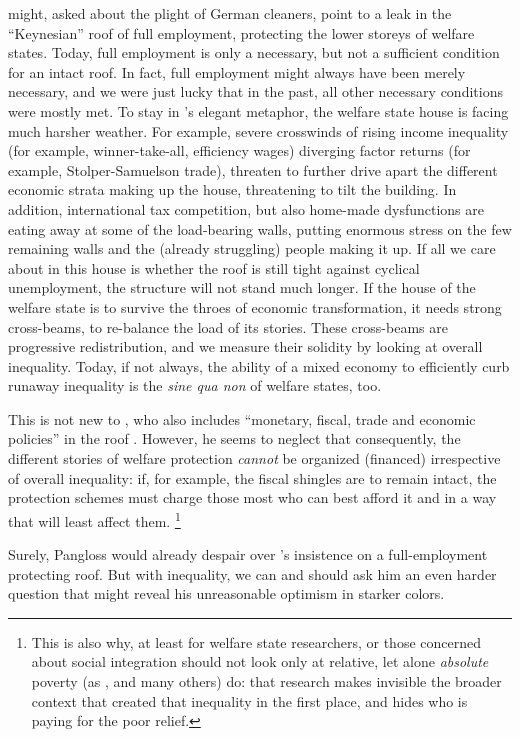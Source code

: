 \begin{enumerate}
	\citeauthor{Offe2003} might, asked about the plight of German cleaners, point to a leak in the ``Keynesian'' roof of full employment, protecting the lower storeys of welfare states.
	Today, full employment is only a necessary, but not a sufficient condition for an intact roof.
	In fact, full employment might always have been merely necessary, and we were just lucky that in the past, all other necessary conditions were mostly met.
	To stay in \citeauthor{Offe2003}'s elegant metaphor, the welfare state house is facing much harsher weather.
	For example, severe crosswinds of rising income inequality (for example, winner-take-all, efficiency wages) diverging factor returns (for example, Stolper-Samuelson trade), threaten to further drive apart the different economic strata making up the house, threatening to tilt the building.
	In addition, international tax competition, but also home-made dysfunctions are eating away at some of the load-bearing walls, putting enormous stress on the few remaining walls and the (already struggling) people making it up.
	If all we care about in this house is whether the roof is still tight against cyclical unemployment, the structure will not stand much longer.
	If the house of the welfare state is to survive the throes of economic transformation, it needs strong cross-beams, to re-balance the load of its stories.
	These cross-beams are progressive redistribution, and we measure their solidity by looking at overall inequality.
	Today, if not always, the ability of a mixed economy to efficiently curb runaway inequality is the \emph{sine qua non} of welfare states, too.

	This is not new to \cite{Offe2003}, who also includes ``monetary, fiscal, trade and economic policies'' in the roof \citeyearpar[543]{Offe2003}.
	However, he seems to neglect that consequently, the different stories of welfare protection \emph{cannot} be organized (financed) irrespective of overall inequality:
	if, for example, the fiscal shingles are to remain intact, the protection schemes must charge those most who can best afford it and in a way that will least affect them.
	\footnote{
		This is also why, at least for welfare state researchers, or those concerned about social integration should not look only at relative, let alone \emph{absolute} poverty (as \citet[1]{Grow2005}, and many others) do:
		that research makes invisible the broader context that created that inequality in the first place, and hides who is paying for the poor relief.
	}

	Surely, Pangloss would already despair over \cite{Offe2003}'s insistence on a full-employment protecting roof.
	But with inequality, we can and should ask him an even harder question that might reveal his unreasonable optimism in starker colors.


\end{enumerate}
